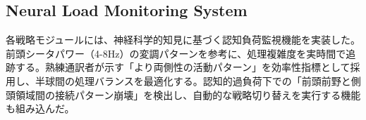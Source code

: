 \subsection{Neural Load Monitoring System}

各戦略モジュールには、神経科学的知見に基づく認知負荷監視機能を実装した。前頭シータパワー（4-8Hz）の変調パターンを参考に、処理複雑度を実時間で追跡する。熟練通訳者が示す「より両側性の活動パターン」を効率性指標として採用し、半球間の処理バランスを最適化する。認知的過負荷下での「前頭前野と側頭領域間の接続パターン崩壊」を検出し、自動的な戦略切り替えを実行する機能も組み込んだ。 